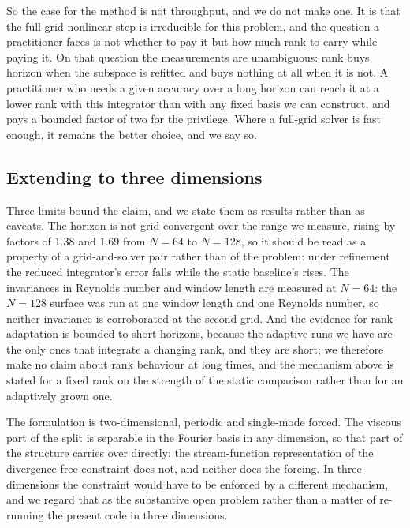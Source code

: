 So the case for the method is not throughput, and we do not make one. It is that the
full-grid nonlinear step is irreducible for this problem, and the question a practitioner
faces is not whether to pay it but how much rank to carry while paying it. On that
question the measurements are unambiguous: rank buys horizon when the subspace is
refitted and buys nothing at all when it is not. A practitioner who needs a given
accuracy over a long horizon can reach it at a lower rank with this integrator than
with any fixed basis we can construct, and pays a bounded factor of two for the
privilege. Where a full-grid solver is fast enough, it remains the better choice, and
we say so.

\subsection{Extending to three dimensions}
\label{sec:disc-3d}

Three limits bound the claim, and we state them as results rather than as caveats.
The horizon is not grid-convergent over the range we measure, rising by factors of $1.38$ and $1.69$ from $N=64$ to $N=128$, so it should be read as a property of a
grid-and-solver pair rather than of the problem: under refinement the reduced
integrator's error falls while the static baseline's rises. The invariances in Reynolds number and
window length are measured at $N=64$: the $N=128$ surface was run at one window length
and one Reynolds number, so neither invariance is corroborated at the second grid. And
the evidence for rank adaptation is bounded to short horizons, because the adaptive
runs we have are the only ones that integrate a changing rank, and they are short; we
therefore make no claim about rank behaviour at long times, and the mechanism above is
stated for a fixed rank on the strength of the static comparison rather than for an
adaptively grown one.

The formulation is two-dimensional, periodic and single-mode forced. The viscous part
of the split is separable in the Fourier basis in any dimension, so that part of the
structure carries over directly; the stream-function representation of the
divergence-free constraint does not, and neither does the forcing. In three dimensions
the constraint would have to be enforced by a different mechanism, and we regard that as
the substantive open problem rather than a matter of re-running the present code in
three dimensions.
